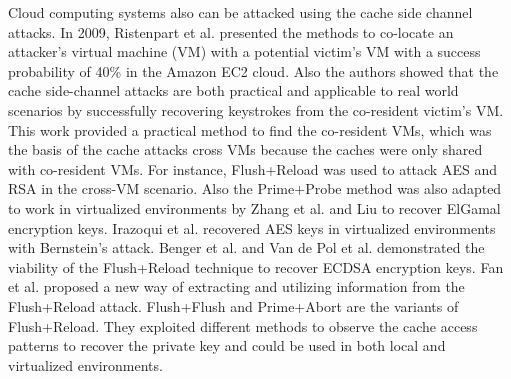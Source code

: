 Cloud computing systems also can be attacked using the cache side channel attacks.
In 2009, Ristenpart et al. \cite{get-off-my-cloud} presented the methods to co-locate an attacker’s virtual machine (VM) with a potential victim’s VM with a success probability of 40\% in the Amazon EC2 cloud.
 Also the authors  showed that the cache side-channel attacks are both practical and applicable to real world scenarios by successfully recovering keystrokes from the co-resident victim’s VM.
This work provided a practical method to find the co-resident VMs, which was the basis of the cache attacks cross VMs because the caches were only shared with co-resident VMs.
For instance, Flush+Reload was used to attack AES \cite{Irazoqui2014} and RSA\cite{flushreload} in the cross-VM scenario.
Also the Prime+Probe method was also
adapted to work in virtualized environments by Zhang et al. \cite{YinqianZhang2012-cross-vm} and Liu \cite{liu2015last} to recover ElGamal encryption keys.
Irazoqui et al. \cite{fine2014} recovered AES keys in virtualized environments with Bernstein’s attack.
Benger et al. \cite{Benger2014} and Van de Pol et al. \cite{Van2015} demonstrated the viability of the Flush+Reload technique to recover ECDSA encryption keys.
Fan et al. \cite{Fan2016} proposed a new way of extracting and utilizing information from the Flush+Reload attack.
Flush+Flush \cite{gruss2016flush} and Prime+Abort \cite{disselkoen2017prime+abort} are the variants of Flush+Reload.
They exploited different methods to observe the cache access patterns to recover the private key and could be used in both local and virtualized environments.





